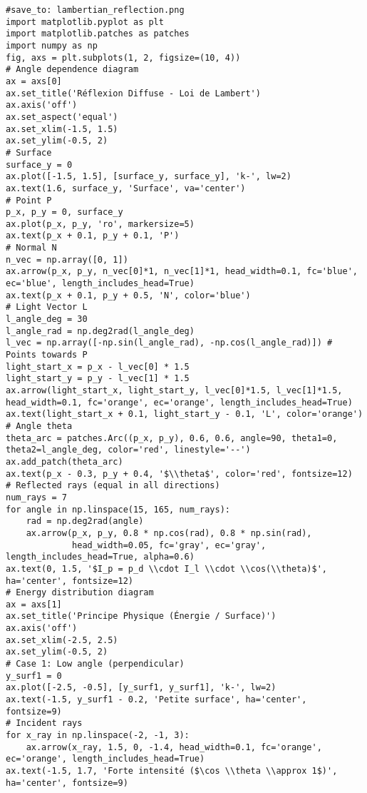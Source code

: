 \begin{verbatim}
#save_to: lambertian_reflection.png
import matplotlib.pyplot as plt
import matplotlib.patches as patches
import numpy as np
fig, axs = plt.subplots(1, 2, figsize=(10, 4))
# Angle dependence diagram
ax = axs[0]
ax.set_title('Réflexion Diffuse - Loi de Lambert')
ax.axis('off')
ax.set_aspect('equal')
ax.set_xlim(-1.5, 1.5)
ax.set_ylim(-0.5, 2)
# Surface
surface_y = 0
ax.plot([-1.5, 1.5], [surface_y, surface_y], 'k-', lw=2)
ax.text(1.6, surface_y, 'Surface', va='center')
# Point P
p_x, p_y = 0, surface_y
ax.plot(p_x, p_y, 'ro', markersize=5)
ax.text(p_x + 0.1, p_y + 0.1, 'P')
# Normal N
n_vec = np.array([0, 1])
ax.arrow(p_x, p_y, n_vec[0]*1, n_vec[1]*1, head_width=0.1, fc='blue', ec='blue', length_includes_head=True)
ax.text(p_x + 0.1, p_y + 0.5, 'N', color='blue')
# Light Vector L
l_angle_deg = 30
l_angle_rad = np.deg2rad(l_angle_deg)
l_vec = np.array([-np.sin(l_angle_rad), -np.cos(l_angle_rad)]) # Points towards P
light_start_x = p_x - l_vec[0] * 1.5
light_start_y = p_y - l_vec[1] * 1.5
ax.arrow(light_start_x, light_start_y, l_vec[0]*1.5, l_vec[1]*1.5, head_width=0.1, fc='orange', ec='orange', length_includes_head=True)
ax.text(light_start_x + 0.1, light_start_y - 0.1, 'L', color='orange')
# Angle theta
theta_arc = patches.Arc((p_x, p_y), 0.6, 0.6, angle=90, theta1=0, theta2=l_angle_deg, color='red', linestyle='--')
ax.add_patch(theta_arc)
ax.text(p_x - 0.3, p_y + 0.4, '$\\theta$', color='red', fontsize=12)
# Reflected rays (equal in all directions)
num_rays = 7
for angle in np.linspace(15, 165, num_rays):
    rad = np.deg2rad(angle)
    ax.arrow(p_x, p_y, 0.8 * np.cos(rad), 0.8 * np.sin(rad),
             head_width=0.05, fc='gray', ec='gray', length_includes_head=True, alpha=0.6)
ax.text(0, 1.5, '$I_p = p_d \\cdot I_l \\cdot \\cos(\\theta)$', ha='center', fontsize=12)
# Energy distribution diagram
ax = axs[1]
ax.set_title('Principe Physique (Énergie / Surface)')
ax.axis('off')
ax.set_xlim(-2.5, 2.5)
ax.set_ylim(-0.5, 2)
# Case 1: Low angle (perpendicular)
y_surf1 = 0
ax.plot([-2.5, -0.5], [y_surf1, y_surf1], 'k-', lw=2)
ax.text(-1.5, y_surf1 - 0.2, 'Petite surface', ha='center', fontsize=9)
# Incident rays
for x_ray in np.linspace(-2, -1, 3):
    ax.arrow(x_ray, 1.5, 0, -1.4, head_width=0.1, fc='orange', ec='orange', length_includes_head=True)
ax.text(-1.5, 1.7, 'Forte intensité ($\cos \\theta \\approx 1$)', ha='center', fontsize=9)

\end{verbatim}
